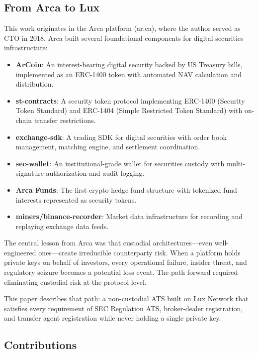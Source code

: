 \documentclass[11pt,a4paper]{article}
\begin{document}
\subsection{From Arca to Lux}

This work originates in the Arca platform (ar.ca), where the author served as CTO in 2018. Arca built several foundational components for digital securities infrastructure:

\begin{itemize}[nosep]
  \item \textbf{ArCoin}: An interest-bearing digital security backed by US Treasury bills, implemented as an ERC-1400 token with automated NAV calculation and distribution.
  \item \textbf{st-contracts}: A security token protocol implementing ERC-1400 (Security Token Standard) and ERC-1404 (Simple Restricted Token Standard) with on-chain transfer restrictions.
  \item \textbf{exchange-sdk}: A trading SDK for digital securities with order book management, matching engine, and settlement coordination.
  \item \textbf{sec-wallet}: An institutional-grade wallet for securities custody with multi-signature authorization and audit logging.
  \item \textbf{Arca Funds}: The first crypto hedge fund structure with tokenized fund interests represented as security tokens.
  \item \textbf{miners/binance-recorder}: Market data infrastructure for recording and replaying exchange data feeds.
\end{itemize}

The central lesson from Arca was that custodial architectures---even well-engineered ones---create irreducible counterparty risk. When a platform holds private keys on behalf of investors, every operational failure, insider threat, and regulatory seizure becomes a potential loss event. The path forward required eliminating custodial risk at the protocol level.

This paper describes that path: a non-custodial ATS built on Lux Network that satisfies every requirement of SEC Regulation ATS, broker-dealer registration, and transfer agent registration while never holding a single private key.

\subsection{Contributions}
\end{document}
